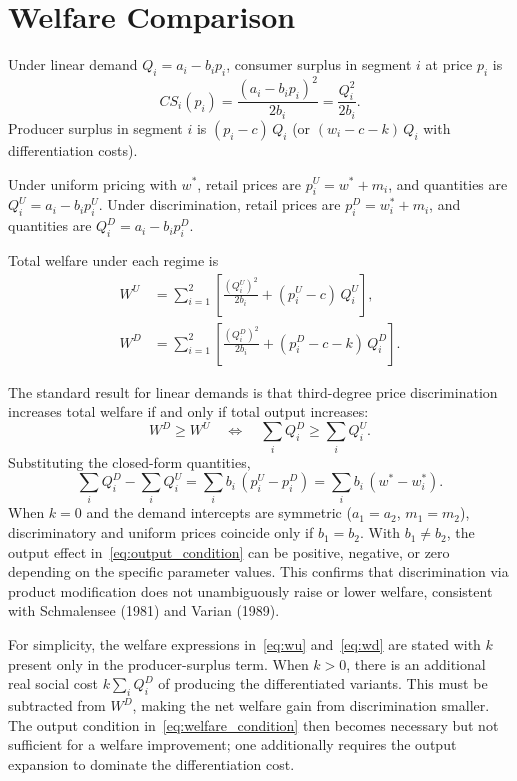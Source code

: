\documentclass[12pt]{article}
\theoremstyle{definition}
\begin{document}
\appendix

\section{Welfare Comparison}\label{app:welfare}

Under linear demand $Q_i = a_i - b_i p_i$, consumer surplus in segment $i$ at price $p_i$ is
\begin{equation}\label{eq:cs}
CS_i(p_i) = \frac{(a_i - b_i p_i)^2}{2b_i} = \frac{Q_i^2}{2b_i}.
\end{equation}
Producer surplus in segment $i$ is $(p_i - c)\,Q_i$ (or $(w_i - c - k)\,Q_i$ with differentiation costs).

Under uniform pricing with $w^*$, retail prices are $p_i^U = w^* + m_i$, and quantities are $Q_i^U = a_i - b_i p_i^U$.
Under discrimination, retail prices are $p_i^D = w_i^* + m_i$, and quantities are $Q_i^D = a_i - b_i p_i^D$.

Total welfare under each regime is
\begin{align}
W^U &= \sum_{i=1}^{2}\left[\frac{(Q_i^U)^2}{2b_i} + (p_i^U - c)\,Q_i^U\right], \label{eq:wu}\\[6pt]
W^D &= \sum_{i=1}^{2}\left[\frac{(Q_i^D)^2}{2b_i} + (p_i^D - c - k)\,Q_i^D\right]. \label{eq:wd}
\end{align}

The standard result for linear demands is that third-degree price discrimination increases total welfare if and only if total output increases:
\begin{equation}\label{eq:welfare_condition}
W^D \ge W^U \quad\Longleftrightarrow\quad \sum_{i} Q_i^D \ge \sum_{i} Q_i^U.
\end{equation}
Substituting the closed-form quantities,
\begin{equation}\label{eq:output_condition}
\sum_{i} Q_i^D - \sum_{i} Q_i^U = \sum_{i} b_i\,(p_i^U - p_i^D) = \sum_i b_i\,(w^* - w_i^*).
\end{equation}
When $k = 0$ and the demand intercepts are symmetric ($a_1 = a_2$, $m_1 = m_2$), discriminatory and uniform prices coincide only if $b_1 = b_2$. With $b_1 \ne b_2$, the output effect in~\eqref{eq:output_condition} can be positive, negative, or zero depending on the specific parameter values. This confirms that discrimination via product modification does not unambiguously raise or lower welfare, consistent with Schmalensee (1981) and Varian (1989).

For simplicity, the welfare expressions in~\eqref{eq:wu} and~\eqref{eq:wd} are stated with $k$ present only in the producer-surplus term. When $k > 0$, there is an additional real social cost $k\sum_i Q_i^D$ of producing the differentiated variants. This must be subtracted from $W^D$, making the net welfare gain from discrimination smaller. The output condition in~\eqref{eq:welfare_condition} then becomes necessary but not sufficient for a welfare improvement; one additionally requires the output expansion to dominate the differentiation cost.
\end{document}
